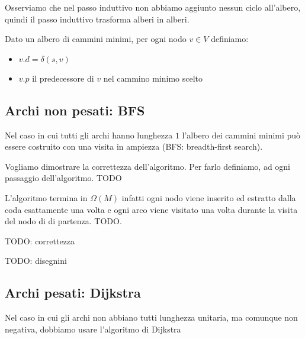 \documentclass[a4paper,10pt]{amsbook}
\theoremstyle{plain}
\theoremstyle{definition}
\theoremstyle{remark}
\begin{document}
Osserviamo che nel passo induttivo non abbiamo aggiunto nessun ciclo
all'albero, quindi il passo induttivo trasforma alberi in alberi.

Dato un albero di cammini minimi, per ogni nodo $v\in V$ definiamo:
\begin{itemize}
\item $v.d = \delta(s,v)$
\item $v.p$ il predecessore di $v$ nel cammino minimo scelto
\end{itemize}

\subsection{Archi non pesati: BFS}

Nel caso in cui tutti gli archi hanno lunghezza $1$ l'albero dei
cammini minimi può essere costruito con una visita in ampiezza (BFS:
breadth-first search).

\begin{algorithmic}
  \EndFor
      \EndIf
    \EndFor
  \EndWhile
\end{algorithmic}

Vogliamo dimostrare la correttezza dell'algoritmo. Per farlo definiamo,
ad ogni passaggio dell'algoritmo. TODO

L'algoritmo termina in $\Omega (M)$ infatti ogni nodo viene inserito
ed estratto dalla coda esattamente una volta e ogni arco viene
visitato una volta durante la visita del nodo di di partenza. TODO.

TODO: correttezza

TODO: disegnini

\subsection{Archi pesati: Dijkstra}

Nel caso in cui gli archi non abbiano tutti lunghezza unitaria, ma
comunque non negativa, dobbiamo usare l'algoritmo di Dijkstra

\begin{algorithmic}
  \EndFor
      \EndIf
    \EndFor
  \EndWhile
\end{algorithmic}
\end{document}
